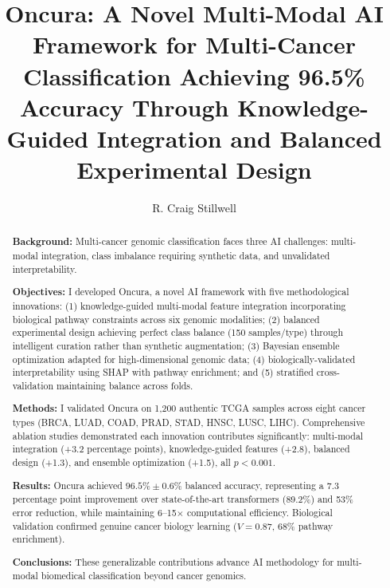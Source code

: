 \documentclass[manuscript, screen, review]{jair}
\begin{document}
\title[Oncura: Multi-Modal AI for Cancer Classification]{Oncura: A Novel Multi-Modal AI Framework for Multi-Cancer Classification Achieving 96.5\% Accuracy Through Knowledge-Guided Integration and Balanced Experimental Design}

\author{R. Craig Stillwell}

\begin{abstract}
\textbf{Background:} Multi-cancer genomic classification faces three AI challenges: multi-modal integration, class imbalance requiring synthetic data, and unvalidated interpretability.

\textbf{Objectives:} I developed Oncura, a novel AI framework with five methodological innovations: (1) knowledge-guided multi-modal feature integration incorporating biological pathway constraints across six genomic modalities; (2) balanced experimental design achieving perfect class balance (150 samples/type) through intelligent curation rather than synthetic augmentation; (3) Bayesian ensemble optimization adapted for high-dimensional genomic data; (4) biologically-validated interpretability using SHAP with pathway enrichment; and (5) stratified cross-validation maintaining balance across folds.

\textbf{Methods:} I validated Oncura on 1,200 authentic TCGA samples across eight cancer types (BRCA, LUAD, COAD, PRAD, STAD, HNSC, LUSC, LIHC). Comprehensive ablation studies demonstrated each innovation contributes significantly: multi-modal integration (+3.2 percentage points), knowledge-guided features (+2.8), balanced design (+1.3), and ensemble optimization (+1.5), all $p<0.001$.

\textbf{Results:} Oncura achieved $96.5\%\pm0.6\%$ balanced accuracy, representing a 7.3 percentage point improvement over state-of-the-art transformers (89.2\%) and 53\% error reduction, while maintaining 6--15$\times$ computational efficiency. Biological validation confirmed genuine cancer biology learning ($V=0.87$, 68\% pathway enrichment).

\textbf{Conclusions:} These generalizable contributions advance AI methodology for multi-modal biomedical classification beyond cancer genomics.
\end{abstract}

\renewcommand{\shortauthors}{Stillwell}
\end{document}
